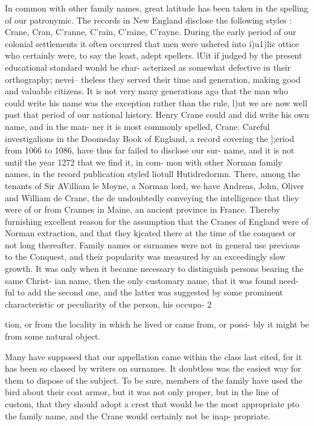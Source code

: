 \documentclass{book}
\begin{document}
In common with other family names, great latitude has been 
taken in the spelling of our patronymic. The records in New 
England disclose the following styles : Crane, Cran, C'ranne, 
C'rain, C'raine, C'rayne. During the early period of our colonial 
settlements it often occurred that men were ushered into i)u1)lic 
ottice who certainly were, to say the least, adept spellers. lUit 
if judged by the present educational standard wonld be char- 
acterized as somewhat defective in their orthography; nevei-- 
theless they served their time and generation, making good and 
valuable citizens. It is not very many generations ago that the 
man who could write his name was the exception rather than the 
rule, l)ut we are now well past that period of our national history. 
Henry Crane could and did write his own name, and in the man- 
ner it is most commonly spelled, Crane. Careful investigalions 
in the Doomsday Book of England, a record covering the ];eriod 
from 1066 to 1086, have thus far failed to disclose our sur- 
name, and it is not until the year 1272 that we find it, in com- 
mon with other Norman family names, in the record publication 
styled liotull Hutidredormn. There, among the tenants of Sir 
AVilliam le Moyne, a Norman lord, we have Andreas, John, 
Oliver and William de Crane, the de undoubtedly conveying the 
intelligence that tliey were of or from Crannes in Maine, an 
ancient province in France. Thereby furnishing excellent reason 
for the assumption that the Cranes of England were of Norman 
extraction, and that they kjcated there at the time of the conquest 
or not long thereafter. Family names or surnames were not in 
general use previous to the Conquest, and their popularity was 
measured by an exceedingly slow growth. It was only when it 
became necessary to distinguish persons bearing the same Christ- 
ian name, then the only customary name, that it was found need- 
ful to add the second one, and the latter was suggested by some 
prominent characteristic or peculiarity of the person, his occupa- 
2 




tion, or from the locality in which he lived or came from, or possi- 
bly it might be from some natural object. 

Many have supposed that our appellation came within the class 
last cited, for it has been so classed by writers on surnames. It 
doubtless was the easiest way for them to dispose of the subject. 
To be sure, members of the family have used the bird about their 
coat armor, but it was not only proper, but in the line of custom, 
that they should adopt a crest that would be the most appropriate 
pto the family name, and the Crane would certainly not be inap- 
propriate. 
\end{document}
